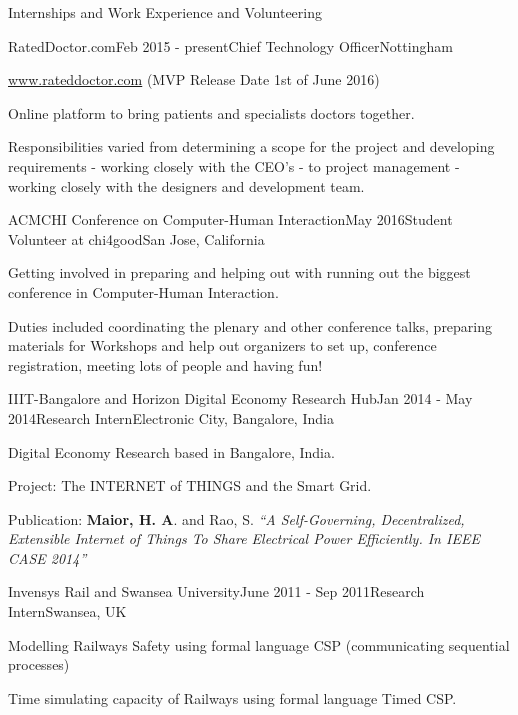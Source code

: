 \documentclass{resume} %
\begin{document}
\begin{rSection}{Internships and Work Experience and Volunteering}
    \begin{rSubsection}{RatedDoctor.com}{Feb 2015 - present}{Chief Technology Officer}{Nottingham}
        \item \url{www.rateddoctor.com} (MVP Release Date 1st of June 2016)
        \item Online platform to bring patients and specialists doctors together.
        \item Responsibilities varied from determining a scope for the project and developing requirements - working closely with the CEO’s - to project management - working closely with the designers and development team.
    \end{rSubsection}

\begin{rSubsection}{ACMCHI Conference on  Computer-Human Interaction}{May 2016}{Student Volunteer at chi4good}{San Jose, California}
        \item Getting involved in preparing and helping out with running out the biggest conference in Computer-Human Interaction. 
        \item Duties included coordinating the plenary and other conference talks, preparing materials for Workshops and help out organizers to set up, conference registration, meeting lots of people and having fun!
    \end{rSubsection}

\begin{rSubsection}{IIIT-Bangalore and Horizon Digital Economy Research Hub}{Jan 2014 - May 2014}{Research Intern}{Electronic City, Bangalore, India}
\item Digital Economy Research based in Bangalore, India.
\item Project: The INTERNET of THINGS and the Smart Grid.
\item Publication: \textbf{Maior, H. A}. and Rao, S.  \emph{``A Self-Governing, Decentralized, Extensible Internet of Things To Share Electrical Power Efficiently. In IEEE CASE 2014''}
\end{rSubsection}
\begin{rSubsection}{Invensys Rail and Swansea University}{June 2011 - Sep 2011}{Research Intern}{Swansea, UK}
\item Modelling Railways Safety using formal language CSP (communicating sequential processes)
\item Time simulating capacity of Railways using formal language Timed CSP.
\end{rSubsection}


\end{rSection}
\end{document}
